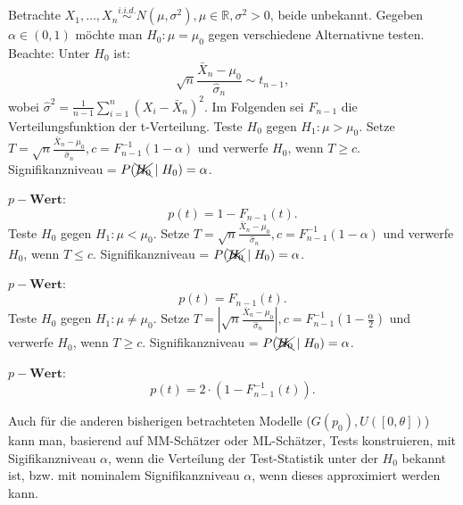 \documentclass[10pt]{article}
\newcommand{\FZV}{X_1, \ldots, X_n} %
\newcommand{\IR}{\mathbb{R}} %
\newenvironment{BSP}[1][]
{\begin{Beispiel}[frametitle=#1]}{\end{Beispiel}}
\begin{document}
	\begin{BSP}[Beispiel 2.0.4 (Der t-Test)]
		Betrachte $\FZV \overset{i.i.d.}{\sim} N(\mu, \sigma^2), \mu \in \IR, \sigma^2 > 0$, beide unbekannt. 
		Gegeben $\alpha \in (0,1)$ möchte man $H_0: \mu = \mu_0$ gegen verschiedene Alternativne testen.
		Beachte: Unter $H_0$ ist:
		\begin{equation*}
			\sqrt{n} \frac{\bar{X}_n - \mu_0}{\hat{\sigma}_n} \sim t_{n-1},
		\end{equation*}
		wobei $\hat{\sigma}^2 = \frac{1}{n-1} \sum_{i=1}^{n} (X_i - \bar{X}_n)^2$. Im Folgenden sei $F_{n-1}$ die Verteilungsfunktion der t-Verteilung.
		Teste $H_0$ gegen $H_1: \mu > \mu_0$.
		Setze $T=\sqrt{n} \frac{\bar{X}_n - \mu_0}{\hat{\sigma}_n}, c = F^{-1}_{n-1}(1-\alpha)$ und verwerfe $H_0$, wenn $T\geq c$. Signifikanzniveau = $P(\xcancel{H_0} \mid H_0) = \alpha$.
		
		$p-\textbf{Wert}$:
		\begin{equation*}
			p(t)= 1- F_{n-1}(t).
		\end{equation*}
		Teste $H_0$ gegen $H_1: \mu < \mu_0$.
		Setze $T=\sqrt{n} \frac{\bar{X}_n - \mu_0}{\hat{\sigma}_n}, c = F^{-1}_{n-1}(1-\alpha)$ und verwerfe $H_0$, wenn $T\leq c$. Signifikanzniveau = $P(\xcancel{H_0} \mid H_0) = \alpha$.
		
		$p-\textbf{Wert}$:
		\begin{equation*}
			p(t)= F_{n-1}(t).
		\end{equation*}
		Teste $H_0$ gegen $H_1: \mu \neq \mu_0$.
		Setze $T=\left\vert\sqrt{n} \frac{\bar{X}_n - \mu_0}{\hat{\sigma}_n} \right\vert, c = F^{-1}_{n-1}\left(1-\frac{\alpha}{2}\right)$ und verwerfe $H_0$, wenn $T\geq c$. Signifikanzniveau = $P(\xcancel{H_0} \mid H_0) = \alpha$.
		
		$p-\textbf{Wert}$:
		\begin{equation*}
			p(t)= 2\cdot (1- F^{-1}_{n-1}(t)).
		\end{equation*}
	\end{BSP}
	
	\begin{Bemerkung}
		Auch für die anderen bisherigen betrachteten Modelle ($G(p_0), U([0, \theta])$) kann man, basierend auf MM-Schätzer oder ML-Schätzer, Tests konstruieren, mit Sigifikanzniveau $\alpha$, wenn die Verteilung der Test-Statistik unter der $H_0$ bekannt ist, bzw. mit nominalem Signifikanzniveau $\alpha$, wenn dieses approximiert werden kann.
	\end{Bemerkung}
	
\end{document}
